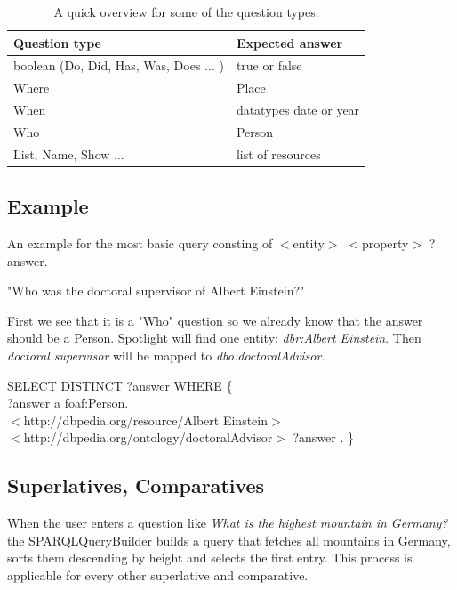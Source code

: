 \documentclass[runningheads]{llncs}
\begin{document}
\begin{table}
	\caption{A quick overview for some of the question types.}\label{tab1}
	\begin{center}
		\begin{tabularx}{\textwidth}{@{}|Y|Y|@{}}
			\hline
			\textbf{Question type} &  \textbf{Expected answer} \\
			\hline
			boolean (Do, Did, Has, Was, Does ... ) &  true or false \\
			\hline
			Where &  Place \\
			\hline
			When &  datatypes date or year \\
			\hline
			Who &  Person \\
			\hline
			List, Name, Show ... &  list of resources \\
			\hline
		\end{tabularx}
	\end{center}
\end{table}

\subsection{Example}
An example for the most basic query consting of $<$entity$>$ $<$property$>$ ?answer.
\begin{example}
	"Who was the doctoral supervisor of Albert Einstein?"\end{example}
First we see that it is a "Who" question so we already know that the answer should be a Person.
Spotlight will find one entity: \textit{dbr:Albert Einstein}. Then \textit{doctoral supervisor} will be mapped to \textit{dbo:doctoralAdvisor}.

\begin{example}
	SELECT DISTINCT ?answer WHERE \{ \\
	\tab[1.8cm] ?answer a foaf:Person. \\
	\tab[1.8cm] $<$http://dbpedia.org/resource/Albert Einstein$>$ \\
	\tab[1.8cm] $<$http://dbpedia.org/ontology/doctoralAdvisor$>$ ?answer . \} \end{example}



\subsection{Superlatives, Comparatives} 

When the user enters a question like \emph{What is the highest mountain in Germany?}  the SPARQLQueryBuilder builds a query that fetches all mountains in Germany, sorts them descending by height and selects the first entry. This process is applicable for every other superlative and comparative. \\
\end{document}

